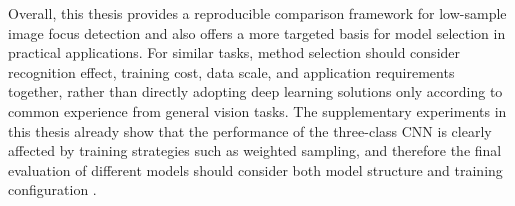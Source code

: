 \par Overall, this thesis provides a reproducible comparison framework for
low-sample image focus detection and also offers a more targeted basis for model
selection in practical applications. For similar tasks, method selection should
consider recognition effect, training cost, data scale, and application
requirements together, rather than directly adopting deep learning solutions
only according to common experience from general vision tasks. The supplementary
experiments in this thesis already show that the performance of the three-class
CNN is clearly affected by training strategies such as weighted sampling, and
therefore the final evaluation of different models should consider both model
structure and training configuration
\cite{he2009learning,buda2018systematic,Cui_2019_CVPR}.
